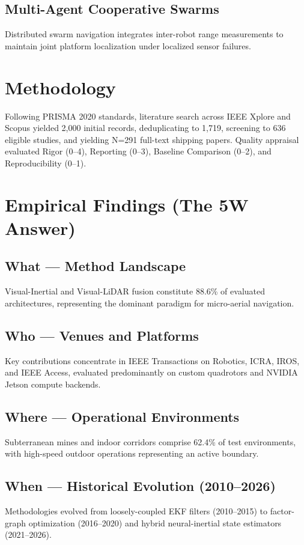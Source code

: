 \documentclass[journal,10pt,twocolumn]{IEEEtran}
\begin{document}
\subsection{Multi-Agent Cooperative Swarms}
Distributed swarm navigation integrates inter-robot range measurements to maintain joint platform localization under localized sensor failures.

\section{Methodology}
Following PRISMA 2020 standards, literature search across IEEE Xplore and Scopus yielded 2,000 initial records, deduplicating to 1,719, screening to 636 eligible studies, and yielding N=291 full-text shipping papers. Quality appraisal evaluated Rigor (0--4), Reporting (0--3), Baseline Comparison (0--2), and Reproducibility (0--1).

\section{Empirical Findings (The 5W Answer)}
\subsection{What --- Method Landscape}
Visual-Inertial and Visual-LiDAR fusion constitute 88.6\% of evaluated architectures, representing the dominant paradigm for micro-aerial navigation.

\subsection{Who --- Venues and Platforms}
Key contributions concentrate in IEEE Transactions on Robotics, ICRA, IROS, and IEEE Access, evaluated predominantly on custom quadrotors and NVIDIA Jetson compute backends.

\subsection{Where --- Operational Environments}
Subterranean mines and indoor corridors comprise 62.4\% of test environments, with high-speed outdoor operations representing an active boundary.

\subsection{When --- Historical Evolution (2010--2026)}
Methodologies evolved from loosely-coupled EKF filters (2010--2015) to factor-graph optimization (2016--2020) and hybrid neural-inertial state estimators (2021--2026).
\end{document}
